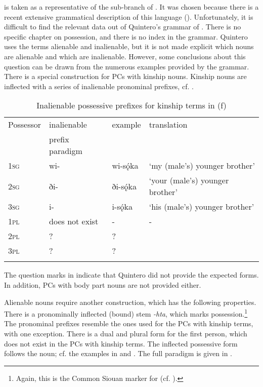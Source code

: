 \documentclass[output=paper]{LSP/langsci}
\begin{document}
 is taken as a representative of the  sub-branch of . It was chosen because there is a recent extensive grammatical description of this language (\citealt{Quintero2004}). Unfortunately, it is difficult to find the relevant data out of Quintero's grammar of . There is no specific chapter on possession, and there is no index in the grammar. Quintero uses the terms alienable and inalienable, but it is not made explicit which nouns are alienable and which are inalienable. However, some conclusions about this question can be drawn from the numerous examples provided by the grammar.
There is a special construction for PCs with  kinship nouns. Kinship nouns are inflected with a series of inalienable pronominal prefixes, cf. .

\begin{table}
\caption{Inalienable possessive prefixes for kinship terms in  (\citealt[481]{Quintero2004}f)} \label{osageinalienable}
\begin{tabular}{ l l l l }
\lsptoprule
Possessor	 & inalienable & example & translation \\
& prefix paradigm & & \\
\midrule
\textsc{1sg} & wi-	& wi-sǫ́ka & `my (male's) younger brother' \\
 
\textsc{2sg} & ði- & ði-sǫ́ka & `your (male's) younger brother' \\
 
\textsc{3sg} & i- & i-sǫ́ka & `his (male's) younger brother' \\
 
\textsc{1pl} & does not exist &	- & - \\
 
\textsc{2pl} & ? & ? & \\
 
\textsc{3pl} & ? & ? & \\
\lspbottomrule
\end{tabular}
\end{table}
 
The question marks in  indicate that Quintero did not provide the expected forms. In addition, PCs with  body part nouns are not provided either.

Alienable nouns require another construction, which has the following properties. There is a pronominally inflected (bound) stem \textit{-hta}, which marks possession.\footnote{Again, this is the Common Siouan marker for  (cf. \citealt{RankinEtAl2015AccessMay}).} The pronominal prefixes resemble the ones used for the PCs with  kinship terms, with one exception. There is a dual and plural form for the first person, which does not exist in the PCs with  kinship terms. The inflected possessive form follows the  noun; cf. the examples in  and . The full paradigm is given in .
\end{document}
